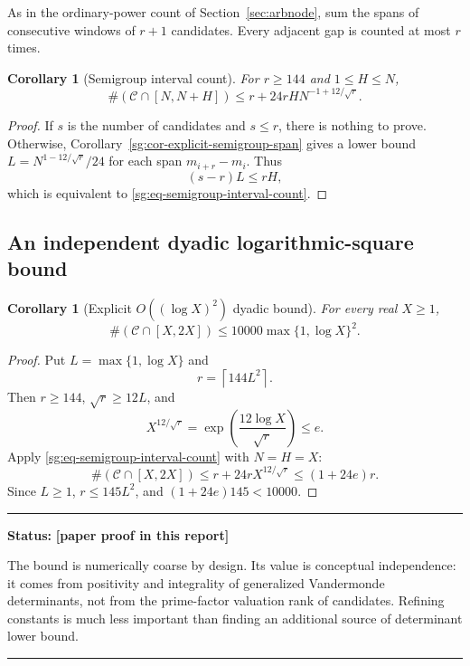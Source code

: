 \documentclass[11pt,oneside]{article}
\newtheorem{corollary}[theorem]{Corollary}
\theoremstyle{definition}
\theoremstyle{remark}
\newcommand{\Cand}{\mathcal C}
\newcommand{\statusnew}{\textcolor{newgreen}{\textbf{[paper proof in this report]}}}
\newenvironment{statusbox}[1]
{\begin{center}\begin{minipage}{0.94\textwidth}\raggedright\hbadness=10000\hrule
\vspace{0.45em}\textbf{Status:} #1\par\vspace{0.35em}}
{\vspace{0.35em}\hrule\end{minipage}\end{center}}
\begin{document}
As in the ordinary-power count of Section~\ref{sec:arbnode}, sum the spans of consecutive
windows of $r+1$ candidates.  Every adjacent gap is counted at most $r$ times.

\begin{corollary}[Semigroup interval count]
\label{sg:cor-semigroup-interval-count}
For $r\ge144$ and $1\le H\le N$,
\begin{equation}
 \#(\Cand\cap[N,N+H])
 \le r+24rH N^{-1+12/\sqrt r}.
 \label{sg:eq-semigroup-interval-count}
\end{equation}
\end{corollary}

\begin{proof}
If $s$ is the number of candidates and $s\le r$, there is nothing to prove.  Otherwise,
Corollary~\ref{sg:cor-explicit-semigroup-span} gives a lower bound
$L=N^{1-12/\sqrt r}/24$ for each span $m_{i+r}-m_i$.  Thus
\[
 (s-r)L\le rH,
\]
which is equivalent to \eqref{sg:eq-semigroup-interval-count}.
\end{proof}

\subsection{An independent dyadic logarithmic-square bound}

\begin{corollary}[Explicit $O((\log X)^2)$ dyadic bound]
\label{sg:cor-semigroup-log-square}
For every real $X\ge1$,
\begin{equation}
 \#(\Cand\cap[X,2X])
 \le10000\max\{1,\log X\}^2.
 \label{sg:eq-semigroup-log-square}
\end{equation}
\end{corollary}

\begin{proof}
Put $L=\max\{1,\log X\}$ and
\[
 r=\left\lceil144L^2\right\rceil.
\]
Then $r\ge144$, $\sqrt r\ge12L$, and
\[
 X^{12/\sqrt r}
 =\exp\!\left(\frac{12\log X}{\sqrt r}\right)
 \le e.
\]
Apply \eqref{sg:eq-semigroup-interval-count} with $N=H=X$:
\[
 \#(\Cand\cap[X,2X])
 \le r+24rX^{12/\sqrt r}
 \le(1+24e)r.
\]
Since $L\ge1$, $r\le145L^2$, and
$(1+24e)145<10000$.
\end{proof}

\begin{statusbox}{\statusnew}
The bound is numerically coarse by design.  Its value is conceptual independence: it comes
from positivity and integrality of generalized Vandermonde determinants, not from the
prime-factor valuation rank of candidates.  Refining constants is much less important than
finding an additional source of determinant lower bound.
\end{statusbox}
\end{document}
